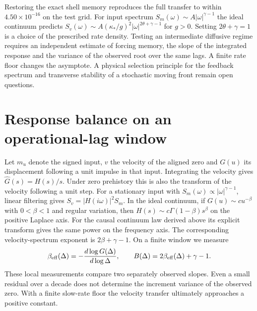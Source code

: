 \documentclass[11pt]{article}
\begin{document}
Restoring the exact shell memory reproduces the full transfer to within
\(4.50\times10^{-16}\) on the test grid. For input spectrum
\(S_m(\omega)\sim A|\omega|^{\gamma-1}\) the ideal continuum predicts
\(S_v(\omega)\sim A(\kappa_*/g)^2|\omega|^{2\theta+\gamma-1}\) for
\(g>0\). Setting \(2\theta+\gamma=1\) is a choice of the prescribed
rate density. Testing an intermediate diffusive regime requires an
independent estimate of forcing memory, the slope of the integrated
response and the variance of the observed root over the same lags. A
finite rate floor changes the asymptote. A physical selection principle
for the feedback spectrum and transverse stability of a stochastic moving
front remain open questions.

\section{Response balance on an operational-lag window}
\label{sec:response-balance}

Let \(m_u\) denote the signed input, \(v\) the velocity of the aligned zero and
\(G(u)\) its displacement following a unit impulse in that input. Integrating
the velocity gives \(\widehat G(s)=H(s)/s\). Under zero prehistory this is
also the transform of the velocity following a unit step. For a stationary
input with \(S_m(\omega)\propto |\omega|^{\gamma-1}\), linear filtering
gives \(S_v=|H(i\omega)|^2 S_m\). In the ideal continuum, if
\(G(u)\sim c u^{-\beta}\) with \(0<\beta<1\) and regular variation,
then \(H(s)\sim c\Gamma(1-\beta)s^\beta\) on the positive Laplace axis.
For the causal continuum law derived above its explicit transform gives the
same power on the frequency axis. The corresponding velocity-spectrum
exponent is \(2\beta+\gamma-1\). On a finite window we measure
\[
 \beta_{\rm eff}(\Delta)=-\frac{d\log G(\Delta)}{d\log\Delta},
 \qquad B(\Delta)=2\beta_{\rm eff}(\Delta)+\gamma-1 .
\]
These local measurements compare two separately observed slopes. Even a
small residual over a decade does not determine the increment variance of
the observed zero. With a finite slow-rate floor the velocity transfer
ultimately approaches a positive constant.
\end{document}
